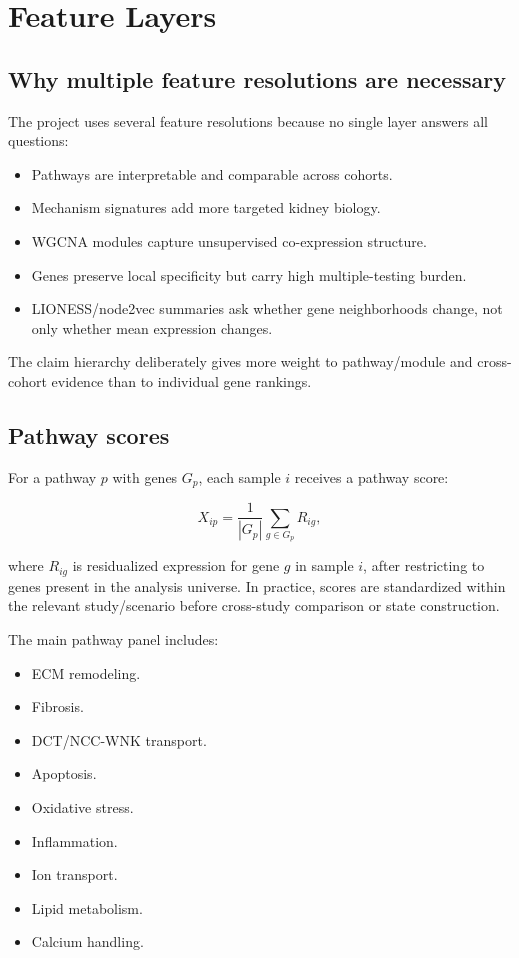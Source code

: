 \documentclass[11pt]{article}
\begin{document}
\section{Feature Layers}

\subsection{Why multiple feature resolutions are necessary}

The project uses several feature resolutions because no single layer answers all questions:

\begin{itemize}
  \item Pathways are interpretable and comparable across cohorts.
  \item Mechanism signatures add more targeted kidney biology.
  \item WGCNA modules capture unsupervised co-expression structure.
  \item Genes preserve local specificity but carry high multiple-testing burden.
  \item LIONESS/node2vec summaries ask whether gene neighborhoods change, not only whether mean expression changes.
\end{itemize}

The claim hierarchy deliberately gives more weight to pathway/module and cross-cohort evidence than to individual gene rankings.

\subsection{Pathway scores}

For a pathway $p$ with genes $G_p$, each sample $i$ receives a pathway score:

\begin{equation}
X_{ip}=\frac{1}{|G_p|}\sum_{g\in G_p}R_{ig},
\end{equation}

where $R_{ig}$ is residualized expression for gene $g$ in sample $i$, after restricting to genes present in the analysis universe. In practice, scores are standardized within the relevant study/scenario before cross-study comparison or state construction.

The main pathway panel includes:

\begin{itemize}
  \item ECM remodeling.
  \item Fibrosis.
  \item DCT/NCC-WNK transport.
  \item Apoptosis.
  \item Oxidative stress.
  \item Inflammation.
  \item Ion transport.
  \item Lipid metabolism.
  \item Calcium handling.
\end{itemize}
\end{document}
